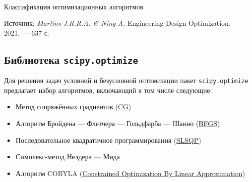\documentclass[11pt,a4paper]{article}
\providecommand{\tightlist}{%
      \setlength{\itemsep}{0pt}\setlength{\parskip}{0pt}}
\begin{document}
    \begin{center}
    \\
    Классификация оптимизационных алгоритмов
    \end{center}

Источник:
\emph{Martins J.R.R.A. \& Ning A.} Engineering Design Optimization. ---
2021. --- 637 с.

    \hypertarget{ux431ux438ux431ux43bux438ux43eux442ux435ux43aux430-scipy.optimize}{%
\subsection{\texorpdfstring{Библиотека
\texttt{scipy.optimize}}{Библиотека scipy.optimize}}\label{ux431ux438ux431ux43bux438ux43eux442ux435ux43aux430-scipy.optimize}}

    Для решения задач условной и безусловной оптимизации пакет
\texttt{scipy.optimize} предлагает набор алгоритмов, включающий в том
числе следующие:

\begin{itemize}
\tightlist
\item
  Метод сопряжённых градиентов
  (\href{http://www.machinelearning.ru/wiki/index.php?title=\%D0\%9C\%D0\%B5\%D1\%82\%D0\%BE\%D0\%B4_\%D1\%81\%D0\%BE\%D0\%BF\%D1\%80\%D1\%8F\%D0\%B6\%D1\%91\%D0\%BD\%D0\%BD\%D1\%8B\%D1\%85_\%D0\%B3\%D1\%80\%D0\%B0\%D0\%B4\%D0\%B8\%D0\%B5\%D0\%BD\%D1\%82\%D0\%BE\%D0\%B2}{CG})
\item
  Алгоритм Бройдена --- Флетчера --- Гольдфарба
  --- Шанно
  (\href{https://ru.wikipedia.org/wiki/\%D0\%90\%D0\%BB\%D0\%B3\%D0\%BE\%D1\%80\%D0\%B8\%D1\%82\%D0\%BC_\%D0\%91\%D1\%80\%D0\%BE\%D0\%B9\%D0\%B4\%D0\%B5\%D0\%BD\%D0\%B0_\%E2\%80\%94_\%D0\%A4\%D0\%BB\%D0\%B5\%D1\%82\%D1\%87\%D0\%B5\%D1\%80\%D0\%B0_\%E2\%80\%94_\%D0\%93\%D0\%BE\%D0\%BB\%D1\%8C\%D0\%B4\%D1\%84\%D0\%B0\%D1\%80\%D0\%B1\%D0\%B0_\%E2\%80\%94_\%D0\%A8\%D0\%B0\%D0\%BD\%D0\%BD\%D0\%BE}{BFGS})
\item
  Последовательное квадратичное программирования
  (\href{https://ru.wikipedia.org/wiki/\%D0\%9F\%D0\%BE\%D1\%81\%D0\%BB\%D0\%B5\%D0\%B4\%D0\%BE\%D0\%B2\%D0\%B0\%D1\%82\%D0\%B5\%D0\%BB\%D1\%8C\%D0\%BD\%D0\%BE\%D0\%B5_\%D0\%BA\%D0\%B2\%D0\%B0\%D0\%B4\%D1\%80\%D0\%B0\%D1\%82\%D0\%B8\%D1\%87\%D0\%BD\%D0\%BE\%D0\%B5_\%D0\%BF\%D1\%80\%D0\%BE\%D0\%B3\%D1\%80\%D0\%B0\%D0\%BC\%D0\%BC\%D0\%B8\%D1\%80\%D0\%BE\%D0\%B2\%D0\%B0\%D0\%BD\%D0\%B8\%D0\%B5}{SLSQP})
\item
  Симплекс-метод
  \href{https://ru.wikipedia.org/wiki/\%D0\%9C\%D0\%B5\%D1\%82\%D0\%BE\%D0\%B4_\%D0\%9D\%D0\%B5\%D0\%BB\%D0\%B4\%D0\%B5\%D1\%80\%D0\%B0_\%E2\%80\%94_\%D0\%9C\%D0\%B8\%D0\%B4\%D0\%B0}{Нелдера
  --- Мида}
\item
  Алгоритм COBYLA
  (\href{https://en.wikipedia.org/wiki/Michael_J._D._Powell}{Constrained
  Optimization By Linear Approximation})
\end{itemize}
\end{document}
